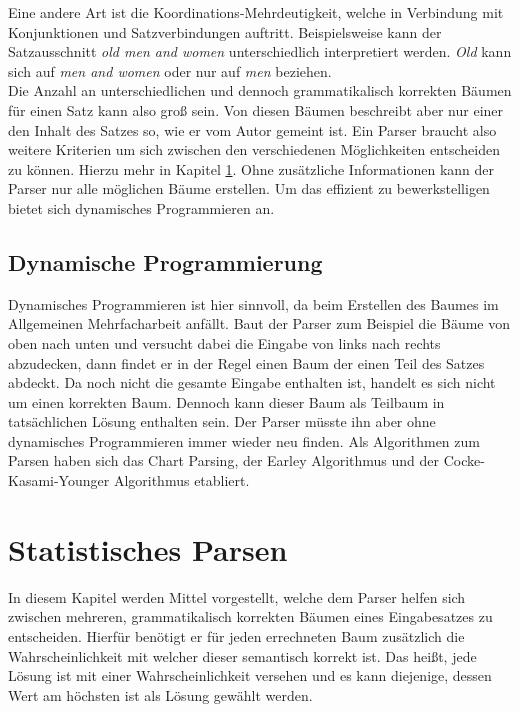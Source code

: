 Eine andere Art ist die Koordinations-Mehrdeutigkeit, welche in Verbindung mit Konjunktionen und Satzverbindungen auftritt. Beispielsweise kann der Satzausschnitt \textit{old men and women} unterschiedlich interpretiert werden. \textit{Old} kann sich auf \textit{men and women} oder nur auf \textit{men} beziehen. \\
Die Anzahl an unterschiedlichen und dennoch grammatikalisch korrekten Bäumen für einen Satz kann also groß sein. %
Von diesen Bäumen beschreibt aber nur einer den Inhalt des Satzes so, wie er vom Autor gemeint ist. Ein Parser braucht also weitere Kriterien um sich zwischen den verschiedenen Möglichkeiten entscheiden zu können. Hierzu mehr in Kapitel \ref{sec:nlp:stat-parsen}. Ohne zusätzliche Informationen kann der Parser nur alle möglichen Bäume erstellen. Um das effizient zu bewerkstelligen bietet sich dynamisches Programmieren an. 

\subsection{Dynamische Programmierung}
\label{sec:nlp:syn-parsen:dyn-progr}

Dynamisches Programmieren ist hier sinnvoll, da beim Erstellen des Baumes im Allgemeinen Mehrfacharbeit anfällt. Baut der Parser zum Beispiel die Bäume von oben nach unten und versucht dabei die Eingabe von links nach rechts abzudecken, dann findet er in der Regel einen Baum der einen Teil des Satzes abdeckt. Da noch nicht die gesamte Eingabe enthalten ist, handelt es sich nicht um einen korrekten Baum. Dennoch kann dieser Baum als Teilbaum in tatsächlichen Lösung enthalten sein. Der Parser müsste ihn aber ohne dynamisches Programmieren immer wieder neu finden. Als Algorithmen zum Parsen haben sich das Chart Parsing, der Earley Algorithmus und der Cocke-Kasami-Younger Algorithmus etabliert.

\section{Statistisches Parsen}
\label{sec:nlp:stat-parsen}

In diesem Kapitel werden Mittel vorgestellt, welche dem Parser helfen sich zwischen mehreren, grammatikalisch korrekten Bäumen eines Eingabesatzes zu entscheiden. Hierfür benötigt er für jeden errechneten Baum zusätzlich die Wahrscheinlichkeit mit welcher dieser semantisch korrekt ist. Das heißt, jede Lösung ist mit einer Wahrscheinlichkeit versehen und es kann diejenige, dessen Wert am höchsten ist als Lösung gewählt werden. %

